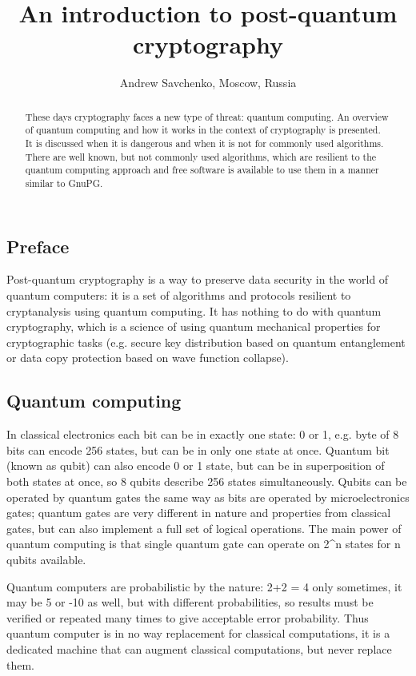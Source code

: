 \documentclass[10pt, a5paper]{article}
\begin{document}
\title{An introduction to post-quantum cryptography}
\author{Andrew Savchenko, Moscow, Russia}
\maketitle
\begin{abstract}
These days cryptography faces a new type of threat: quantum
computing. An overview of quantum computing and how it works in the context of cryptography is presented. It is discussed when it is dangerous and when it is not for commonly used algorithms. There are well known, but not commonly used algorithms, which are resilient to the quantum computing approach and free \linebreak software is available to use them in a manner similar to GnuPG.
\end{abstract}
\subsection*{Preface}

Post-quantum cryptography is a way to preserve data security in the world of quantum computers: it is a set of algorithms and protocols resilient to cryptanalysis using quantum computing\footnotemark[1]. It has nothing to do with quantum cryptography, which is a science of using quantum mechanical properties for cryptographic tasks (e.g. secure key \linebreak distribution based on quantum entanglement or data copy protection based on wave function collapse).

\subsection*{Quantum computing}

In classical electronics each bit can be in exactly one state: 0 or 1, e.g. byte of 8 bits can encode 256 states, but can be in only one state at once. Quantum bit (known as qubit) can also encode 0 or 1 state, but can be in superposition of both states at once, so 8 qubits describe 256 states simultaneously. Qubits can be operated by quantum gates the same way as bits are operated by microelectronics gates; quantum gates are very different in nature and properties from classical gates, but can also implement a full set of logical operations. The main power of quantum computing is that single quantum gate can operate on 2\^{}n states for n qubits available.

Quantum computers are probabilistic by the nature: 2+2 = 4 only sometimes, it may be 5 or -10 as well, but with different probabilities, so results must be verified or repeated many times to give acceptable error probability. Thus quantum computer is in no way replacement for classical computations, it is a dedicated machine that can augment classical computations, but never replace them.
\end{document}
